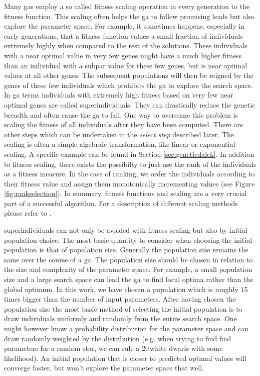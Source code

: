 Many \glspl{ga} employ a so called \gls{fitness} scaling operation in every generation to the \gls{fitness} function. This scaling often helps the \gls{ga} to follow promising leads but also explore the parameter space. For example, it sometimes happens, especially in early generations, that a \gls{fitness} function values a small fraction of individuals extremely highly when compared to the rest of the solutions. These \glspl{individual} with a near optimal value in very few \glspl{gene} might have a much higher \gls{fitness} than an \gls{individual} with a subpar value for these few \glspl{gene}, but is near optimal values at all other \glspl{gene}. The subsequent populations will then be reigned by the \glspl{gene} of these few individuals which prohibits the \gls{ga} to explore the search space. In \gls{ga} terms individuals with extremely high fitness based on very few near optimal \glspl{gene} are called \glspl{superindividual}. They can drastically reduce the genetic breadth and often cause the \gls{ga} to fail. One way to overcome this problem is scaling the fitness of all individuals after they have been computed. There are other steps which can be undertaken in the \textit{select step} described later. The scaling is often a simple algebraic transformation, like linear or exponential scaling. A specific example can be found in Section \ref{sec:geneticdalek}. In addition to fitness scaling, there exists the possibilty to just use the rank of the individuals as a \gls{fitness} measure. In the case of ranking, we order the \glspl{individual} according to their \gls{fitness} value and assign them monotonically incrementing values (see Figure \ref{fig:rankselection}). In summary, fitness functions and scaling are a very crucial part of a successful algorithm. For a description of different scaling methods please refer to \citet{Kreinovich93geneticalgorithms}.

\Glspl{superindividual} can not only be avoided with \gls{fitness} scaling but also by initial population choice. The most basic quantity to consider when choosing the initial population is that of population size. Generally the population size remains the same over the course of a \gls{ga}. The population size should be chosen in relation to the size and complexity of the parameter space. For example, a small population size and a large search space can lead the \gls{ga} to find local optima rather than the global optimum. In this work, we have chosen a population which is roughly 15 times bigger than the number of input parameters. After having chosen the population size the most basic method of selecting the initial population is to draw individuals uniformly and randomly from the entire search space. One might however know a probability distribution for the parameter space and can draw randomly weighted by the distribution (e.g. when trying to find find parameters for a random star, we can rule a 20\,\msun white dwarfs with some likelihood). An initial population that is closer to predicted optimal values will converge faster, but won't explore the parameter space that well. 

